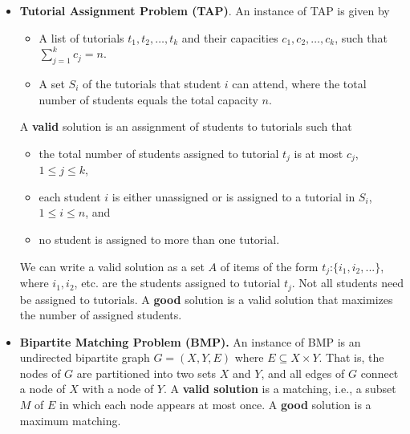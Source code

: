 \documentclass[11pt]{article}
\begin{document}
\begin{itemize}
\item \textbf{Tutorial Assignment Problem (TAP)}. 
An instance of TAP is given by
\begin{itemize}
\item A list of tutorials $t_1, t_2, \ldots, t_k$ and their capacities
$c_1, c_2, \ldots, c_k$, such that $\sum_{j=1}^k c_j = n$.
\item A set $S_i$ of the tutorials that student $i$ can attend, where the total number of
students equals the total capacity $n$.
\end{itemize}
A \textbf{valid} solution is an assignment of students to tutorials such that 
\begin{itemize}
\item the total number of students assigned to tutorial $t_j$ is at most $c_j$, $1\le j \le k$,
\item each student $i$ is either unassigned or is assigned to a tutorial in $S_i$, $1 \le i \le n$, and
\item no student is assigned to more than one tutorial.
\end{itemize}
We can write a valid solution as a set $A$ of items
of the form $t_j$:$\{i_1,i_2,...\}$, where $i_1,i_2$, etc. are
the students assigned to tutorial $t_j$. Not all
students need be assigned to tutorials. A \textbf{good} solution is a
valid solution that maximizes the number of assigned students.

\item \textbf{Bipartite Matching Problem (BMP).} An instance of BMP is an undirected
bipartite graph $G=(X,Y,E)$ where $E \subseteq X \times Y$. That
is, the nodes of $G$ are partitioned into two sets $X$ and $Y$, and
all edges of $G$ connect a node of $X$ with a node of $Y$.  A \textbf{valid
solution} is a matching, i.e., a subset $M$ of $E$ in which each
node appears at most once. A \textbf{good} solution is a maximum matching.
\end{itemize}
\end{document}
